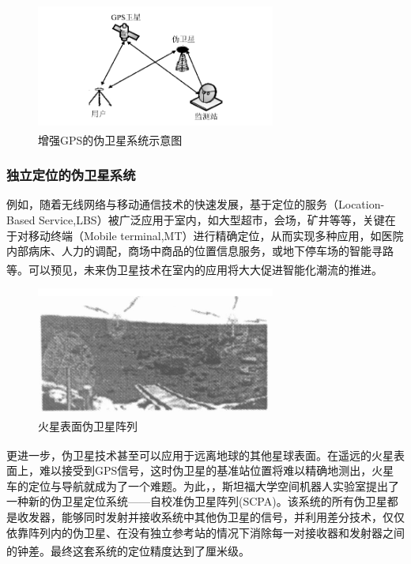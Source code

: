 \documentclass[12pt, a4paper, oneside]{ctexart}
\newcommand{\upcite}[1]{\textsuperscript{\cite{#1}}}
\begin{document}
\begin{figure}[ht]
  \centering
  \includegraphics[width=0.70\textwidth]{img/1.png}
  \caption{增强GPS的伪卫星系统示意图\upcite{002}}
  \label{}
\end{figure}

\subsubsection{独立定位的伪卫星系统}

例如，随着无线网络与移动通信技术的快速发展，基于定位的服务（Location-Based Service,LBS）被广泛应用于室内，如大型超市，会场，矿井等等，关键在于对移动终端（Mobile terminal,MT）进行精确定位，从而实现多种应用，如医院内部病床、人力的调配，商场中商品的位置信息服务，或地下停车场的智能寻路等。\upcite{11,12,06}可以预见，未来伪卫星技术在室内的应用将大大促进智能化潮流的推进。

\begin{figure}[ht]
  \centering
  \includegraphics[width=0.70\textwidth]{img/huoxing.png}
  \caption{火星表面伪卫星阵列\upcite{001}}
  \label{}
\end{figure}

更进一步，伪卫星技术甚至可以应用于远离地球的其他星球表面。\upcite{001}在遥远的火星表面上，难以接受到GPS信号，这时伪卫星的基准站位置将难以精确地测出，火星车的定位与导航就成为了一个难题。为此，，斯坦福大学空间机器人实验室提出了一种新的伪卫星定位系统——自校准伪卫星阵列(SCPA)。该系统的所有伪卫星都是收发器，能够同时发射并接收系统中其他伪卫星的信号，并利用差分技术，仅仅依靠阵列内的伪卫星、在没有独立参考站的情况下消除每一对接收器和发射器之间的钟差。最终这套系统的定位精度达到了厘米级。\upcite{lemaster1998mars}
\end{document}
